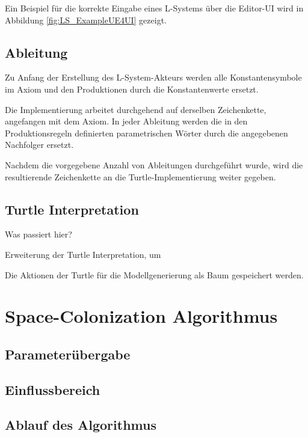 Ein Beispiel für die korrekte Eingabe eines L-Systems über die Editor-UI wird in Abbildung \ref{fig:LS_ExampleUE4UI} gezeigt.

\subsection{Ableitung}

Zu Anfang der Erstellung des L-System-Akteurs werden alle Konstantensymbole im Axiom und den Produktionen durch die Konstantenwerte ersetzt. 

Die Implementierung arbeitet durchgehend auf derselben Zeichenkette, angefangen mit dem Axiom. In jeder Ableitung werden die in den Produktionsregeln definierten parametrischen Wörter durch die angegebenen Nachfolger ersetzt.

Nachdem die vorgegebene Anzahl von Ableitungen durchgeführt wurde, wird die resultierende Zeichenkette an die Turtle-Implementierung weiter gegeben.

\subsection{Turtle Interpretation} \label{subsec:TurtleInterpretationImplementation}



Was passiert hier?

Erweiterung der Turtle Interpretation, um 



Die Aktionen der Turtle für die Modellgenerierung als Baum gespeichert werden. \cite[S.21]{ABOP:04} 

\section{Space-Colonization Algorithmus}

\subsection{Parameterübergabe}

\subsection{Einflussbereich}

\subsection{Ablauf des Algorithmus}


